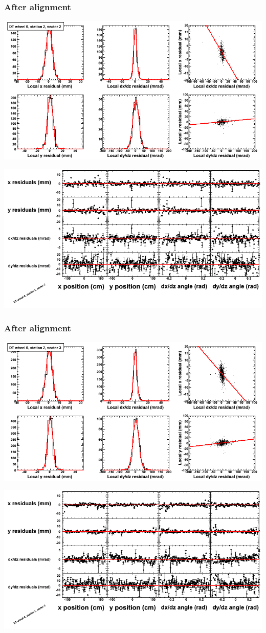 \documentclass[compress]{beamer}
\begin{document}
\begin{frame}
\frametitle{After alignment}
\includegraphics[width=0.7\linewidth]{NOV4_fitfunctions/MBwhCst2sec02_bellcurves.png}

\includegraphics[width=0.7\linewidth]{NOV4_fitfunctions/MBwhCst2sec02_polynomials.png}
\end{frame}

\begin{frame}
\frametitle{After alignment}
\includegraphics[width=0.7\linewidth]{NOV4_fitfunctions/MBwhCst2sec03_bellcurves.png}

\includegraphics[width=0.7\linewidth]{NOV4_fitfunctions/MBwhCst2sec03_polynomials.png}
\end{frame}
\end{document}
